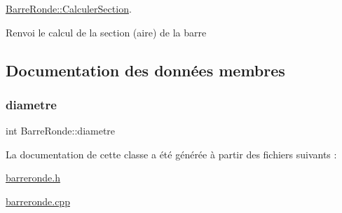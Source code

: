 \hyperlink{class_barre_ronde_adc6f65b51c7ca244fb29f2ed4b9a6f91}{Barre\+Ronde\+::\+Calculer\+Section}. 

Renvoi le calcul de la section (aire) de la barre 

\subsection{Documentation des données membres}
\mbox{\label{class_barre_ronde_a2ad361c8aefdf0f7b25bbcbc1ec4c4ca}} 
\subsubsection{\texorpdfstring{diametre}{diametre}}
{\footnotesize\ttfamily int Barre\+Ronde\+::diametre\hspace{0.3cm}{\ttfamily [private]}}



La documentation de cette classe a été générée à partir des fichiers suivants \+:\begin{DoxyCompactItemize}
\item 
\hyperlink{barreronde_8h}{barreronde.\+h}\item 
\hyperlink{barreronde_8cpp}{barreronde.\+cpp}\end{DoxyCompactItemize}
